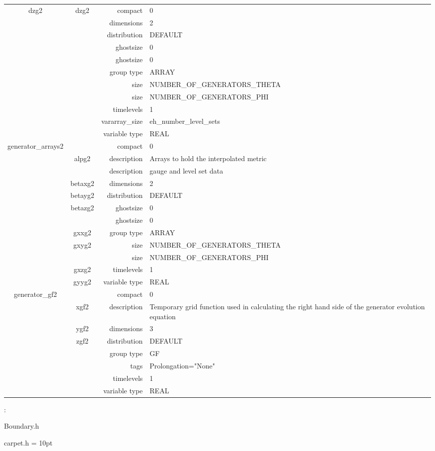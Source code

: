 \begin{tabular*}{150mm}{|c|c@{\extracolsep{\fill}}|rl|}
\hline 
dzg2 & dzg2 & compact & 0 \\ 
 &  & dimensions & 2 \\ 
 &  & distribution & DEFAULT \\ 
 &  & ghostsize & 0 \\ 
& ~ & ghostsize & 0 \\ 
 &  & group type & ARRAY \\ 
 &  & size & NUMBER\_OF\_GENERATORS\_THETA \\ 
& ~ & size & NUMBER\_OF\_GENERATORS\_PHI \\ 
 &  & timelevels & 1 \\ 
 &  & vararray\_size & eh\_number\_level\_sets \\ 
 &  & variable type & REAL \\ 
\hline 
generator\_arrays2 &  & compact & 0 \\ 
 & alpg2 & description & Arrays to hold the interpolated metric \\ 
& ~ & description &  gauge and level set data \\ 
 & betaxg2 & dimensions & 2 \\ 
 & betayg2 & distribution & DEFAULT \\ 
 & betazg2 & ghostsize & 0 \\ 
& ~ & ghostsize & 0 \\ 
 & gxxg2 & group type & ARRAY \\ 
 & gxyg2 & size & NUMBER\_OF\_GENERATORS\_THETA \\ 
& ~ & size & NUMBER\_OF\_GENERATORS\_PHI \\ 
 & gxzg2 & timelevels & 1 \\ 
 & gyyg2 & variable type & REAL \\ 
\hline 
generator\_gf2 &  & compact & 0 \\ 
 & xgf2 & description & Temporary grid function used in calculating the right hand side of the generator evolution equation \\ 
 & ygf2 & dimensions & 3 \\ 
 & zgf2 & distribution & DEFAULT \\ 
 &  & group type & GF \\ 
 &  & tags & Prolongation="None" \\ 
 &  & timelevels & 1 \\ 
 &  & variable type & REAL \\ 
\hline 
\end{tabular*} 



\vspace{5mm}

: 

Boundary.h

carpet.h
\vspace{2mm}\parskip = 10pt 

